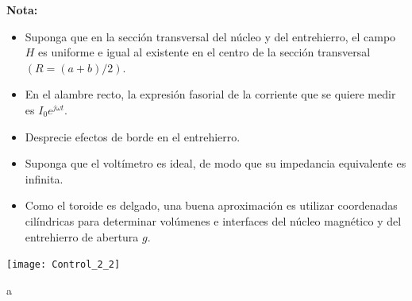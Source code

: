 \documentclass[
  11pt,
  letterpaper,
   addpoints,
  ]{exam}
\begin{document}
\begin{questions}
    \textbf{Nota:}
    \begin{itemize}
        \item Suponga que en la sección transversal del núcleo y del entrehierro, el campo \(H\) es uniforme e igual al existente en el centro de la sección transversal \((R=(a+b)/2)\).
        \item En el alambre recto, la expresión fasorial de la corriente que se quiere medir es \(I_0 e^{j\omega t}\).
        \item Desprecie efectos de borde en el entrehierro.
        \item Suponga que el voltímetro es ideal, de modo que su impedancia equivalente es infinita.
        \item Como el toroide es delgado, una buena aproximación es utilizar coordenadas cilíndricas para determinar volúmenes e interfaces del núcleo magnético y del entrehierro de abertura \(g\).
    \end{itemize}
    \begin{center}
        \texttt{[image: Control\_2\_2]}
    \end{center}
    \begin{solution}
       a
\end{solution}

\end{questions}
\end{document}
